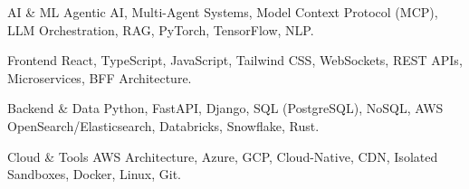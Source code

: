 

\begin{cvskills}

  \cvskill
    {AI \& ML} %
    {Agentic AI, Multi-Agent Systems, Model Context Protocol (MCP), LLM Orchestration, RAG, PyTorch, TensorFlow, NLP.} %

  \cvskill
    {Frontend} %
    {React, TypeScript, JavaScript, Tailwind CSS, WebSockets, REST APIs, Microservices, BFF Architecture.} %

  \cvskill
    {Backend \& Data} %
    {Python, FastAPI, Django, SQL (PostgreSQL), NoSQL, AWS OpenSearch/Elasticsearch, Databricks, Snowflake, Rust.} %

  \cvskill
    {Cloud \& Tools} %
    {AWS Architecture, Azure, GCP, Cloud-Native, CDN, Isolated Sandboxes, Docker, Linux, Git.} %

\end{cvskills}



